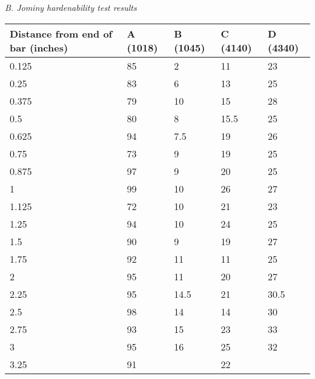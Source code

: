 \documentclass[]{article}
\begin{document}
\emph{B. Jominy hardenability test results}

\begin{longtable}[]{@{}lllll@{}}
\toprule
\textbf{Distance from end of bar (inches)} & \textbf{A (1018)} &
\textbf{B (1045)} & \textbf{C (4140)} & \textbf{D (4340)}\tabularnewline
\midrule
\endhead
0.125 & 85 & 2 & 11 & 23\tabularnewline
0.25 & 83 & 6 & 13 & 25\tabularnewline
0.375 & 79 & 10 & 15 & 28\tabularnewline
0.5 & 80 & 8 & 15.5 & 25\tabularnewline
0.625 & 94 & 7.5 & 19 & 26\tabularnewline
0.75 & 73 & 9 & 19 & 25\tabularnewline
0.875 & 97 & 9 & 20 & 25\tabularnewline
1 & 99 & 10 & 26 & 27\tabularnewline
1.125 & 72 & 10 & 21 & 23\tabularnewline
1.25 & 94 & 10 & 24 & 25\tabularnewline
1.5 & 90 & 9 & 19 & 27\tabularnewline
1.75 & 92 & 11 & 11 & 25\tabularnewline
2 & 95 & 11 & 20 & 27\tabularnewline
2.25 & 95 & 14.5 & 21 & 30.5\tabularnewline
2.5 & 98 & 14 & 14 & 30\tabularnewline
2.75 & 93 & 15 & 23 & 33\tabularnewline
3 & 95 & 16 & 25 & 32\tabularnewline
3.25 & 91 & & 22 &\tabularnewline
\bottomrule
\end{longtable}
\end{document}
